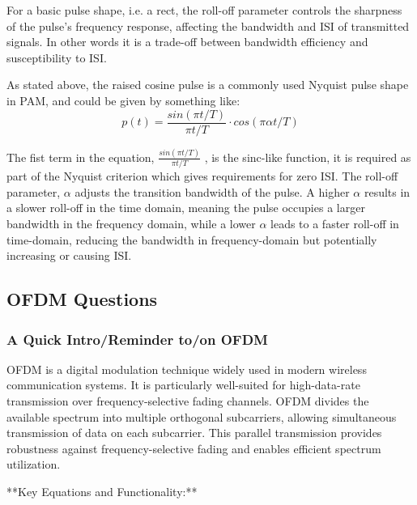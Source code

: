 \documentclass[colorlinks,11pt,a4paper,normalphoto,withhyper,ragged2e]{altareport}
\begin{document}
				For a basic pulse shape, i.e. a rect, the roll-off parameter controls the sharpness of the pulse's frequency response, affecting the bandwidth and ISI of transmitted signals. In other words it is a trade-off between bandwidth efficiency and susceptibility to ISI. \linebreak
				
				As stated above, the raised cosine pulse is a commonly used Nyquist pulse shape in PAM, and could be given by something like: \linebreak
				\begin{equation}
					p(t) = \frac{sin(\pi t / T)}{\pi t / T} \cdot cos(\pi\alpha t / T)
				\end{equation}
				
				The fist term in the equation,  $\frac{sin(\pi t / T)}{\pi t / T}$ , is the sinc-like function, it is required as part of the Nyquist criterion which gives requirements for zero ISI. \linebreak
				The roll-off parameter, $\alpha$ adjusts the transition bandwidth of the pulse. A higher $\alpha$ results in a slower roll-off in the time domain, meaning the pulse occupies a larger bandwidth in the frequency domain, while a lower $\alpha$ leads to a faster roll-off in time-domain, reducing the bandwidth in frequency-domain but potentially increasing or causing ISI.
		
	
	\pagebreak
	
	
	
	
	
	
		\subsection{OFDM Questions}
			
			\subsubsection{A Quick Intro/Reminder to/on OFDM }
			
			OFDM is a digital modulation technique widely used in modern wireless communication systems. It is particularly well-suited for high-data-rate transmission over frequency-selective fading channels. OFDM divides the available spectrum into multiple orthogonal subcarriers, allowing simultaneous transmission of data on each subcarrier. This parallel transmission provides robustness against frequency-selective fading and enables efficient spectrum utilization.
			
			**Key Equations and Functionality:**
			
\end{document}
